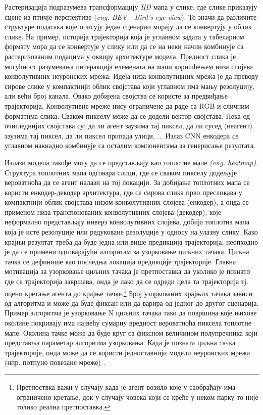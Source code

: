 \documentclass[11pt,oneside]{memoir}
\begin{document}
Растеризација подразумева трансформацију \textit{HD} мапа у слике, где слике приказују сцене из птичје 
перспективе (\textit{eng. BEV - Bird's-eye-view}). То значи да различите структуре података које описују један сценарио 
морају да се конвертују у облик слике. На пример, историја трајекторија која је углавном задата у табеларном формату мора да се конвертује 
у слику или да се на неки начин комбинује са растеризованим подацима у оквиру архитектуре модела.
Предност слика је могућност разумевања интеракција елемената на мапи 
коришћењем низа слојева конволутивних неуронских мрежа.
Идеја низа конволутивних мрежа је да преводу сирове слике у компактнији облик својстава који углавном има мању резолуцију, 
али већи број канала. Овако добијена својства се користе за предвиђање трајекторија.
Конволутивне мреже нису ограничене да раде са RGB и сличним форматима слика. Сваком пикселу може да се додели вектор својстава. 
Нека од очигледнијих својстава су: да ли агент заузима тај пиксел, да ли сусед (неагент) заузима тај пиксел,
да ли пиксел припада улици, ... Излаз CNN енкодера се углавном накнадно комбинује са осталим компонентама за генерисање резултата. 

Излази модела такође могу да се представљају као топлотне мапе \textit{(eng. heatmap)}. Структура топлотних мапа
одговара слици, где се сваком пикселу додељује вероватноћа
да се агент налази на тој локацији. За добијање топлотних мапа се користи енкодер-декодер архитектура, где се сирова слика
прво пресликава у компактнији облик својстава низом конволутивних слојева (енкодер), а онда се
применом низа транспонованих конволутивних слојева (декодер), које неформално представљају инверз конволутивних слојева, добија
топлотна мапа која је исте резолуције или редуковане резолуције у односу на улазну слику.
Како крајњи резултат треба да буде једна или више предикција трајекторија, неопходно је да се примени одговарајући алгоритам за
узорковање циљних тачака. Циљна тачка
се дефинише као последња локација предикције трајекторије. Главна мотивација за узорковање циљних тачака је претпоставка да уколико је познато где се
трајекторија завршава, онда је лако да се одреди цела та трајекторија тј. оцени кретање агента до крајње
тачке.\footnote{Претпоствка важи
у случају када је агент возило које у саобраћају има ограничено кретање, док у случају човека који се креће у неком парку то није толико реална
претпоставка.} Број узоркованих крајњих тачака зависи од алгоритма и може да буде фиксан или да варира од једног до другог сценарија. 
Пример алгоритма је узорковање N циљних тачака тако да површина које њихове околине покривају има највећу сумарну вредност вероватноћа 
пиксела топлотне мапе. Околина
тачке може да буде круг са фиксном величином полупречника који представља параметар алгоритма узорковања. Када је позната циљна тачка трајекторије,
онда може да се користи једноставнији модели неуронских мрежа (нпр. потпуно повезане мреже) \cite{home, centernet}.
\end{document}
